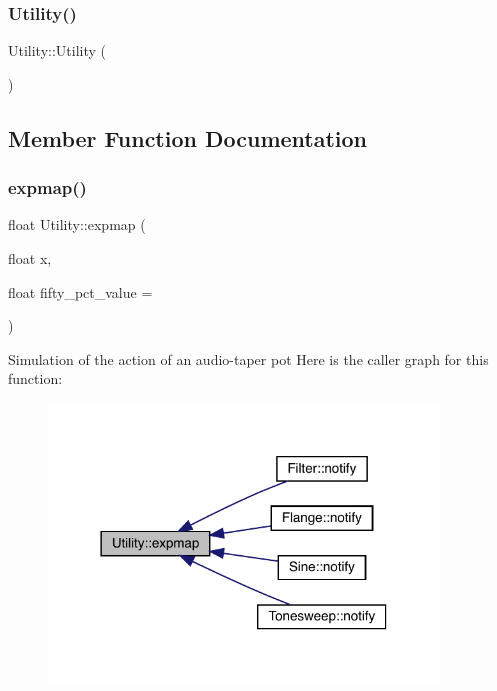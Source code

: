 \subsubsection{\texorpdfstring{Utility()}{Utility()}}
{\footnotesize\ttfamily Utility\+::\+Utility (\begin{DoxyParamCaption}{ }\end{DoxyParamCaption})}



\subsection{Member Function Documentation}
\mbox{\label{class_utility_ae1259b03eaff875dfb05b040a6fb11b1}} 
\subsubsection{\texorpdfstring{expmap()}{expmap()}}
{\footnotesize\ttfamily float Utility\+::expmap (\begin{DoxyParamCaption}\item[{float}]{x,  }\item[{float}]{fifty\+\_\+pct\+\_\+value = {} }\end{DoxyParamCaption})\hspace{0.3cm}{\ttfamily [static]}}

Simulation of the action of an audio-\/taper pot Here is the caller graph for this function\+:\nopagebreak
\begin{figure}[H]
\begin{center}
\leavevmode
\includegraphics[width=294pt]{class_utility_ae1259b03eaff875dfb05b040a6fb11b1_icgraph}
\end{center}
\end{figure}
\mbox{\label{class_utility_af50f94cc1c9126f9f2334686158f617f}} 
